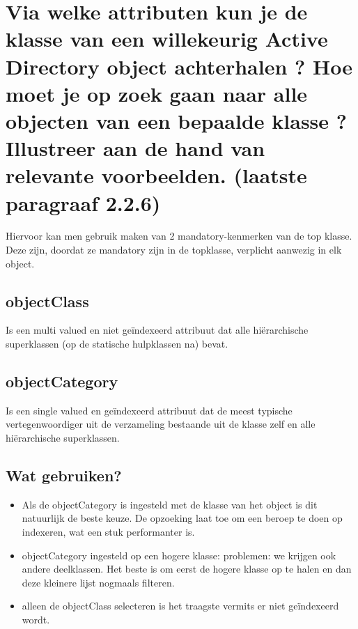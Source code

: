 \section{Via welke attributen kun je de klasse van een willekeurig Active Directory object achterhalen ? Hoe moet je op zoek gaan naar alle objecten van een bepaalde klasse ? Illustreer aan de hand van relevante voorbeelden. (laatste paragraaf 2.2.6)}

Hiervoor kan men gebruik maken van 2 mandatory-kenmerken van de top klasse. Deze zijn, doordat ze mandatory zijn in de topklasse, verplicht aanwezig in elk object.

\subsection{objectClass}
Is een multi valued en niet ge\"indexeerd attribuut dat alle hi\"erarchische superklassen (op de statische hulpklassen na) bevat.

\subsection{objectCategory}
Is een single valued en ge\"indexeerd attribuut dat de meest typische vertegenwoordiger uit de verzameling bestaande uit de klasse zelf en alle hi\"erarchische superklassen.

\subsection{Wat gebruiken?}
\begin{itemize}
\item Als de objectCategory is ingesteld met de klasse van het object is dit natuurlijk de beste keuze. De opzoeking laat toe om een beroep te doen op indexeren, wat een stuk performanter is.
\item objectCategory ingesteld op een hogere klasse: problemen: we krijgen ook andere deelklassen. Het beste is om eerst de hogere klasse op te halen en dan deze kleinere lijst nogmaals filteren. 
\item alleen de objectClass selecteren is het traagste vermits er niet ge\"indexeerd wordt.
\end{itemize}































